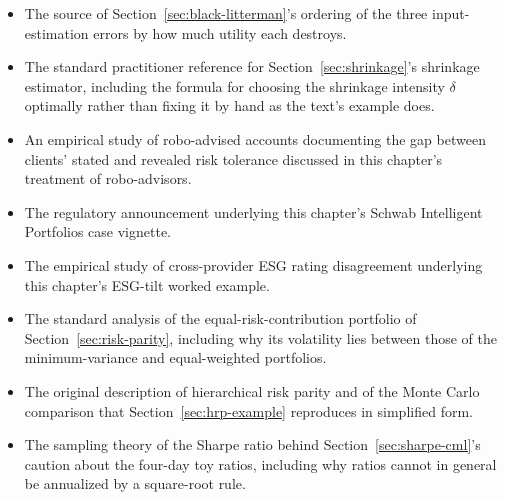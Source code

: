\documentclass[../ai_in_finance]{subfiles}
\begin{document}
\begin{itemize}
    \item {} The source of Section~\ref{sec:black-litterman}'s ordering of the three input-estimation errors by how much utility each destroys.
    \item {} The standard practitioner reference for Section~\ref{sec:shrinkage}'s shrinkage estimator, including the formula for choosing the shrinkage intensity $\delta$ optimally rather than fixing it by hand as the text's example does.
    \item {} An empirical study of robo-advised accounts documenting the gap between clients' stated and revealed risk tolerance discussed in this chapter's treatment of robo-advisors.
    \item {} The regulatory announcement underlying this chapter's Schwab Intelligent Portfolios case vignette.
    \item {} The empirical study of cross-provider ESG rating disagreement underlying this chapter's ESG-tilt worked example.
    \item {} The standard analysis of the equal-risk-contribution portfolio of Section~\ref{sec:risk-parity}, including why its volatility lies between those of the minimum-variance and equal-weighted portfolios.
    \item {} The original description of hierarchical risk parity and of the Monte Carlo comparison that Section~\ref{sec:hrp-example} reproduces in simplified form.
    \item {} The sampling theory of the Sharpe ratio behind Section~\ref{sec:sharpe-cml}'s caution about the four-day toy ratios, including why ratios cannot in general be annualized by a square-root rule.
\end{itemize}
\end{document}
